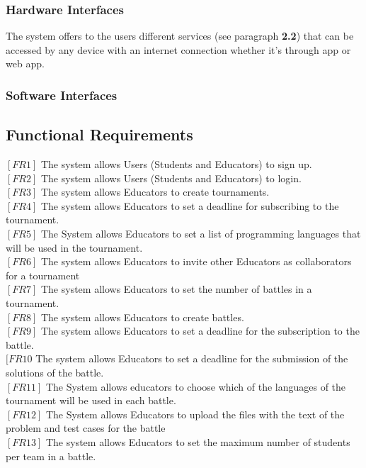 \documentclass{article}
\begin{document}
\subsubsection{Hardware Interfaces}

The system offers to the users different services (see paragraph \textbf{2.2}) that can be accessed by any device with an internet connection whether it's through app or web app.
                            
\subsubsection{Software Interfaces}



\subsection{Functional Requirements}
$[FR1]$ The system allows Users (Students and Educators) to sign up.\\
$[FR2]$ The system allows Users (Students and Educators) to login.\\
$[FR3]$ The system allows Educators to create tournaments.\\
$[FR4]$ The system allows Educators to set a deadline for subscribing to the tournament.\\
$[FR5]$ The System allows Educators to set a list of programming languages that will be used in the tournament.\\
$[FR6]$ The system allows Educators to invite other Educators as collaborators for a tournament\\
$[FR7]$ The system allows Educators to set the number of battles in a tournament.\\
$[FR8]$ The system allows Educators to create battles.\\
$[FR9]$ The system allows Educators to set a deadline for the subscription to the battle.\\
$[FR10$ The system allows Educators to set a deadline for the submission of the solutions of the battle.\\
$[FR11]$ The System allows educators to choose which of the languages of the tournament will be used in each battle.\\
$[FR12]$ The System allows Educators to upload the files with the text of the problem and test cases for the battle\\
$[FR13]$ The system allows Educators to set the maximum number of students per team in a battle.\\
\end{document}
